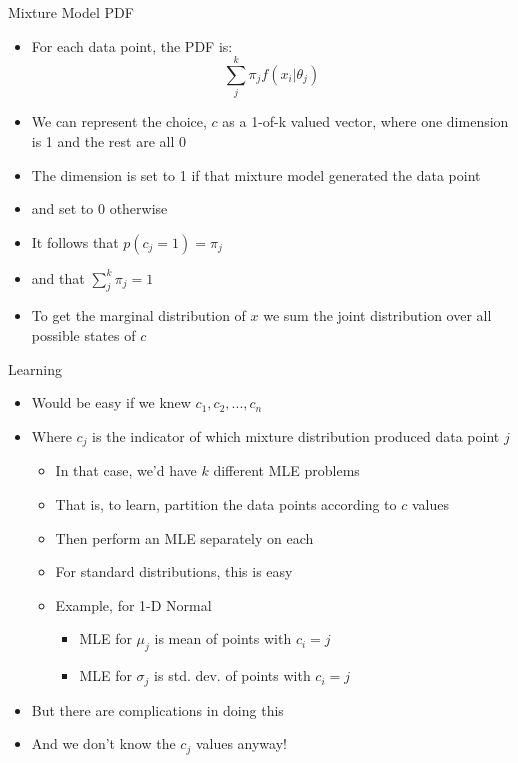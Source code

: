 \documentclass[aspectratio=169]{beamer}
\begin{document}
\begin{frame}{Mixture Model PDF}

\begin{itemize}
\item For each data point, the PDF is:
$$ \sum_j^k \pi_j f (x_i | \theta_j)$$
\item We can represent  the choice, $c$  as a 1-of-k valued vector, where one dimension is 1 and the rest are all 0
\item The dimension is set to 1 if that mixture model generated the data point
\item and set to 0 otherwise
\item It follows that $p(c_j = 1 ) = \pi_j$
\item and that $\sum_j^k \pi_j = 1$
\item To get the marginal distribution of $x$ we sum the joint distribution over all possible states of $c$
\end{itemize}
\end{frame}
\begin{frame}{Learning}

\begin{itemize}
	\item Would be easy if we knew $c_1, c_2, ..., c_n$
	\item Where $c_j$ is the indicator of which mixture distribution produced data point $j$
	\begin{itemize}
		\item In that case, we'd have $k$ different MLE problems
\item That is, to learn, partition the data points according to $c$ values
		\item Then perform an MLE separately on each
 		\item For standard distributions, this is easy
 		\item Example, for 1-D Normal
\begin{itemize}
		\item MLE for $\mu_j$ is mean of points with $c_i = j$
 		\item MLE for $\sigma_j$ is std. dev. of points with $c_i = j$
	\end{itemize}
	\end{itemize}
	\item But there are complications in doing this
	\item And we don't know the $c_j$ values anyway!
\end{itemize}

\end{frame}
\end{document}
